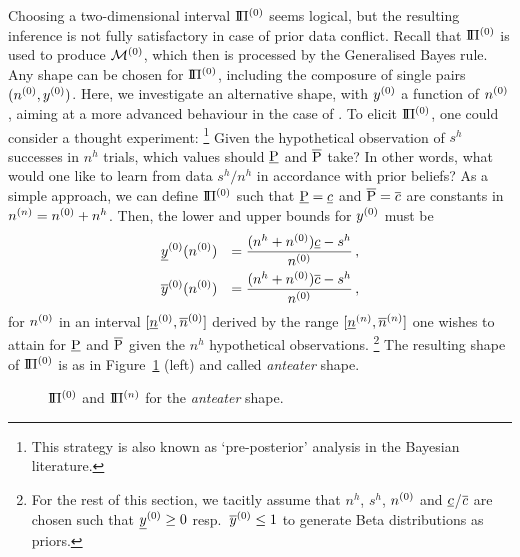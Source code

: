 Choosing a two-dimensional interval $\text{I}\!\Pi^{(0)}$ seems logical,
but the resulting inference is not fully satisfactory in case of prior data conflict.
Recall that $\text{I}\!\Pi^{(0)}$ is used to produce $\mathcal{M}^{(0)}$, %
which then is processed by the Generalised Bayes rule. Any shape can be chosen for $\text{I}\!\Pi^{(0)}$,
including the composure of single pairs $(n^{(0)}, y^{(0)})$. %
Here, we investigate
an alternative shape, with $y^{(0)}$ a function of $n^{(0)}$, aiming at a more advanced behaviour in the case of \pdc.
To elicit $\text{I}\!\Pi^{(0)}$, one could consider a thought experiment:%
\footnote{This strategy is also known as `pre-posterior' analysis in the Bayesian literature.}
Given the hypothetical observation of $s^h$ successes in $n^h$ trials,
which values should $\underline{\operatorname{P}}$ and $\overline{\operatorname{P}}$ take? In other words, what
would one like to learn from data $s^h/n^h$ in accordance with
prior beliefs? As a simple approach, we can define $\text{I}\!\Pi^{(0)}$ such
that $\underline{\operatorname{P}} = \underline{c}$ and $\overline{\operatorname{P}} = \overline{c}$ are constants in $n^{(n)} = n^{(0)} + n^h$.
Then, the lower and upper bounds for $y^{(0)}$ must be %
\begin{equation} \label{equ:anteater-y0}
\begin{aligned}
&
\underline{y}^{(0)}(n^{(0)}) &= \frac{(n^h + n^{(0)})\underline{c} - s^h}{n^{(0)}}\,, \\
&
\overline{y}^{(0)}(n^{(0)}) &= \frac{(n^h + n^{(0)})\overline{c} - s^h}{n^{(0)}}\,,
\end{aligned}
\end{equation}
for $n^{(0)}$ in an interval $[\underline{n}^{(0)}, \overline{n}^{(0)}]$ derived by the range $[\underline{n}^{(n)}, \overline{n}^{(n)}]$ one wishes to attain for $\underline{\operatorname{P}}$ and $\overline{\operatorname{P}}$
given the $n^h$ hypothetical observations.%
\footnote{For the rest of this section, we tacitly assume that $n^h$, $s^h$, $n^{(0)}$ and $\underline{c}$/$\overline{c}$
are chosen such that $\underline{y}^{(0)} \geq 0$ resp.\ $\overline{y}^{(0)} \leq 1$ to generate Beta distributions as priors.}
The resulting shape of $\text{I}\!\Pi^{(0)}$ is as in Figure~\ref{fig:anteater-ex1} (left) and called \emph{anteater} shape.
%
\begin{figure}%
\caption{$\text{I}\!\Pi^{(0)}$ and $\text{I}\!\Pi^{(n)}$ for the \emph{anteater} shape.}
\label{fig:anteater-ex1}
\end{figure}
